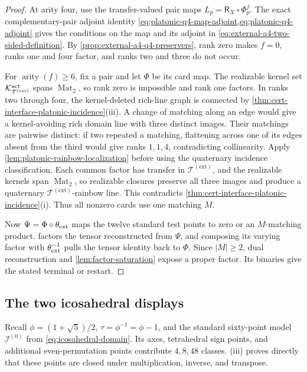 \documentclass[11pt,letterpaper,onecolumn]{article}
\theoremstyle{plain}
\theoremstyle{definition}
\theoremstyle{remark}
\newcommand{\TetExt}{{\mathcal T^{(\mathrm{ext})}}}
\newcommand{\IcoZero}{{\mathcal I^{(0)}}}
\newcommand{\Mat}{\operatorname{Mat}}
\newcommand{\arity}{\operatorname{arity}}
\begin{document}
\begin{proof}
At arity four, use the transfer-valued pair maps
\(L_p=\mathsf R_X\circ\Phi_p^f\).  The exact
complementary-pair adjoint identity
\cref{eq:platonic-q4-map-adjoint,eq:platonic-q4-adjoint} gives the
conditions on the map and its adjoint in
\cref{eq:external-a4-two-sided-definition}.  By
\cref{prop:external-a4-q4-preservers}, rank zero makes \(f=0\), ranks one
and four factor, and ranks two and three do not occur.

For \(\arity(f)\ge6\), fix a pair and let \(\Phi\) be its card map.  The
realizable kernel set \(\mathcal K_{\TetExt}^{\rm act}\) spans
\(\Mat_2\), so rank zero is impossible and rank one
factors.  In ranks two through four, the kernel-deleted rich-line graph is
connected by
\cref{thm:cert-interface-platonic-incidence}\textnormal{(iii)}.  A change of
matching along an edge would give a kernel-avoiding rich domain line with
three distinct images.  Their matchings are pairwise distinct: if two
repeated a matching, flattening across one of its edges absent from the
third would give ranks \(1,1,4\), contradicting collinearity.
Apply \cref{lem:platonic-rainbow-localization} before using the quaternary
incidence classification.  Each common factor has transfer in
\(\TetExt\), and the realizable kernels span \(\Mat_2\), so
realizable closures preserve all three images and produce a quaternary
\(\TetExt\)-rainbow line.  This contradicts
\cref{thm:cert-interface-platonic-incidence}\textnormal{(i)}.
Thus all nonzero cards use one matching \(M\).

Now \(\Psi=\Phi\circ\theta_{\rm ext}\) maps the twelve standard test points
to zero or an \(M\)-matching product.
 factors the tensor reconstructed from
\(\Psi\), and composing
its varying factor with \(\theta_{\rm ext}^{-1}\) pulls the tensor identity back to \(\Phi\).  Since \(|M|\ge2\), dual reconstruction and
\cref{lem:factor-saturation} expose a proper factor. Its binaries give the
stated terminal or restart.
\end{proof}

\subsection{The two icosahedral displays}

Recall \(\phi=(1+\sqrt5)/2\), \(\tau=\phi^{-1}=\phi-1\), and the
standard sixty-point model \(\IcoZero\) from
\cref{eq:icosahedral-domain}.  Its axes, tetrahedral sign points, and
additional even-permutation points contribute \(4,8,48\) classes.
\textnormal{(iii)} proves directly
that these points are closed under
multiplication, inverse, and transpose.
\end{document}
